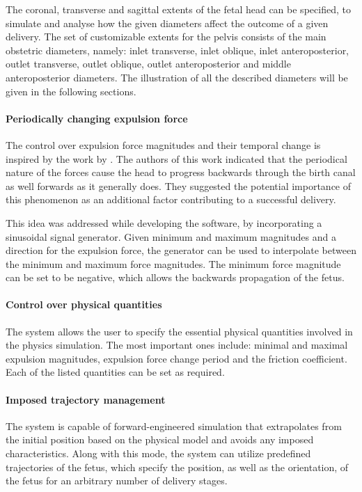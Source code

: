 The coronal, transverse and sagittal extents of the fetal head can be specified, to simulate and analyse how the given diameters affect the outcome of a given delivery. The set of customizable extents for the pelvis consists of the main obstetric diameters, namely: inlet transverse, inlet oblique, inlet anteroposterior, outlet transverse, outlet oblique, outlet anteroposterior and middle anteroposterior diameters. The illustration of all the described diameters will be given in the following sections.

\paragraph{Periodically changing expulsion force}
The control over expulsion force magnitudes and their temporal change is inspired by the work by \citet{Moreau}. The authors of this work indicated that the periodical nature of the forces cause the head to progress backwards through the birth canal as well forwards as it generally does. They suggested the potential importance of this phenomenon as an additional factor contributing to a successful delivery.

This idea was addressed while developing the software, by incorporating a sinusoidal signal generator. Given minimum and maximum magnitudes and a direction for the expulsion force, the generator can be used to interpolate between the minimum and maximum force magnitudes. The minimum force magnitude can be set to be negative, which allows the backwards propagation of the fetus.

\paragraph{Control over physical quantities}
The system allows the user to specify the essential physical quantities involved in the physics simulation. The most important ones include: minimal and maximal expulsion magnitudes, expulsion force change period and the friction coefficient. Each of the listed quantities can be set as required.

\paragraph{Imposed trajectory management}
The system is capable of forward-engineered simulation that extrapolates from the initial position based on the physical model and avoids any imposed characteristics. Along with this mode, the system can utilize predefined trajectories of the fetus, which specify the position, as well as the orientation, of the fetus for an arbitrary number of delivery stages.

